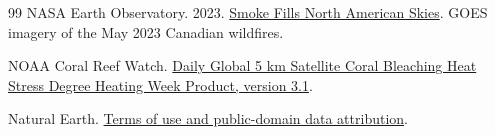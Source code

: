 \documentclass[11pt,letterpaper]{article}
\begin{document}
\begin{thebibliography}{99}
 NASA Earth Observatory. 2023.
\href{https://science.nasa.gov/earth/earth-observatory/smoke-fills-north-american-skies-151346/}{Smoke Fills North American Skies}. GOES imagery of the May 2023 Canadian wildfires.

 NOAA Coral Reef Watch.
\href{https://coralreefwatch.noaa.gov/product/5km/index_5km_dhw.php}{Daily Global 5 km Satellite Coral Bleaching Heat Stress Degree Heating Week Product, version 3.1}.

 Natural Earth.
\href{https://www.naturalearthdata.com/about/terms-of-use/}{Terms of use and public-domain data attribution}.
\end{thebibliography}
\endgroup
\end{document}
